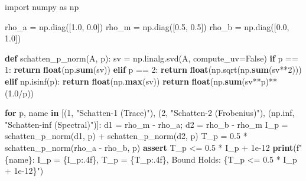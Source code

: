 \documentclass[
]{article}
\newenvironment{Shaded}{\begin{snugshade}}{\end{snugshade}}
\newcommand{\BuiltInTok}[1]{\textcolor[rgb]{0.39,0.29,0.61}{\textbf{#1}}}
\newcommand{\ControlFlowTok}[1]{\textcolor[rgb]{0.12,0.11,0.11}{\textbf{#1}}}
\newcommand{\DecValTok}[1]{\textcolor[rgb]{0.69,0.50,0.00}{#1}}
\newcommand{\FloatTok}[1]{\textcolor[rgb]{0.69,0.50,0.00}{#1}}
\newcommand{\ImportTok}[1]{\textcolor[rgb]{1.00,0.33,0.00}{#1}}
\newcommand{\KeywordTok}[1]{\textcolor[rgb]{0.12,0.11,0.11}{\textbf{#1}}}
\newcommand{\NormalTok}[1]{\textcolor[rgb]{0.12,0.11,0.11}{#1}}
\newcommand{\OperatorTok}[1]{\textcolor[rgb]{0.12,0.11,0.11}{#1}}
\newcommand{\SpecialCharTok}[1]{\textcolor[rgb]{0.24,0.68,0.91}{#1}}
\newcommand{\SpecialStringTok}[1]{\textcolor[rgb]{1.00,0.33,0.00}{#1}}
\newcommand{\StringTok}[1]{\textcolor[rgb]{0.75,0.01,0.01}{#1}}
\newcommand{\VariableTok}[1]{\textcolor[rgb]{0.00,0.34,0.68}{#1}}
\begin{document}
\begin{Shaded}
\begin{Highlighting}[]
\ImportTok{import}\NormalTok{ numpy }\ImportTok{as}\NormalTok{ np}

\NormalTok{rho\_a }\OperatorTok{=}\NormalTok{ np.diag([}\FloatTok{1.0}\NormalTok{, }\FloatTok{0.0}\NormalTok{])}
\NormalTok{rho\_m }\OperatorTok{=}\NormalTok{ np.diag([}\FloatTok{0.5}\NormalTok{, }\FloatTok{0.5}\NormalTok{])}
\NormalTok{rho\_b }\OperatorTok{=}\NormalTok{ np.diag([}\FloatTok{0.0}\NormalTok{, }\FloatTok{1.0}\NormalTok{])}

\KeywordTok{def}\NormalTok{ schatten\_p\_norm(A, p):}
\NormalTok{    sv }\OperatorTok{=}\NormalTok{ np.linalg.svd(A, compute\_uv}\OperatorTok{=}\VariableTok{False}\NormalTok{)}
    \ControlFlowTok{if}\NormalTok{ p }\OperatorTok{==} \DecValTok{1}\NormalTok{: }\ControlFlowTok{return} \BuiltInTok{float}\NormalTok{(np.}\BuiltInTok{sum}\NormalTok{(sv))}
    \ControlFlowTok{elif}\NormalTok{ p }\OperatorTok{==} \DecValTok{2}\NormalTok{: }\ControlFlowTok{return} \BuiltInTok{float}\NormalTok{(np.sqrt(np.}\BuiltInTok{sum}\NormalTok{(sv}\OperatorTok{**}\DecValTok{2}\NormalTok{)))}
    \ControlFlowTok{elif}\NormalTok{ np.isinf(p): }\ControlFlowTok{return} \BuiltInTok{float}\NormalTok{(np.}\BuiltInTok{max}\NormalTok{(sv))}
    \ControlFlowTok{return} \BuiltInTok{float}\NormalTok{(np.}\BuiltInTok{sum}\NormalTok{(sv}\OperatorTok{**}\NormalTok{p)}\OperatorTok{**}\NormalTok{(}\FloatTok{1.0}\OperatorTok{/}\NormalTok{p))}

\ControlFlowTok{for}\NormalTok{ p, name }\KeywordTok{in}\NormalTok{ [(}\DecValTok{1}\NormalTok{, }\StringTok{"Schatten{-}1 (Trace)"}\NormalTok{), (}\DecValTok{2}\NormalTok{, }\StringTok{"Schatten{-}2 (Frobenius)"}\NormalTok{), (np.inf, }\StringTok{"Schatten{-}inf (Spectral)"}\NormalTok{)]:}
\NormalTok{    d1 }\OperatorTok{=}\NormalTok{ rho\_m }\OperatorTok{{-}}\NormalTok{ rho\_a}\OperatorTok{;}\NormalTok{ d2 }\OperatorTok{=}\NormalTok{ rho\_b }\OperatorTok{{-}}\NormalTok{ rho\_m}
\NormalTok{    I\_p }\OperatorTok{=}\NormalTok{ schatten\_p\_norm(d1, p) }\OperatorTok{+}\NormalTok{ schatten\_p\_norm(d2, p)}
\NormalTok{    T\_p }\OperatorTok{=} \FloatTok{0.5} \OperatorTok{*}\NormalTok{ schatten\_p\_norm(rho\_a }\OperatorTok{{-}}\NormalTok{ rho\_b, p)}
    \ControlFlowTok{assert}\NormalTok{ T\_p }\OperatorTok{\textless{}=} \FloatTok{0.5} \OperatorTok{*}\NormalTok{ I\_p }\OperatorTok{+} \FloatTok{1e{-}12}
    \BuiltInTok{print}\NormalTok{(}\SpecialStringTok{f"}\SpecialCharTok{\{}\NormalTok{name}\SpecialCharTok{\}}\SpecialStringTok{: I\_p = }\SpecialCharTok{\{}\NormalTok{I\_p}\SpecialCharTok{:.4f\}}\SpecialStringTok{, T\_p = }\SpecialCharTok{\{}\NormalTok{T\_p}\SpecialCharTok{:.4f\}}\SpecialStringTok{, Bound Holds: }\SpecialCharTok{\{}\NormalTok{T\_p }\OperatorTok{\textless{}=} \FloatTok{0.5} \OperatorTok{*}\NormalTok{ I\_p }\OperatorTok{+} \FloatTok{1e{-}12}\SpecialCharTok{\}}\SpecialStringTok{"}\NormalTok{)}
\end{Highlighting}
\end{Shaded}
\end{document}
